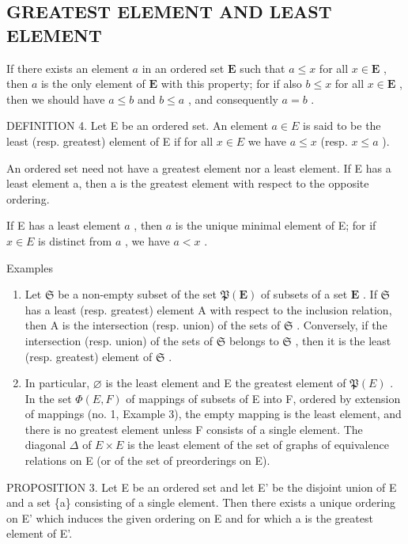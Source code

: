 \subsection{GREATEST ELEMENT AND LEAST ELEMENT}

If there exists an element \(a\) in an ordered set \(\mathbf{E}\) such that \(a \leqslant x\) for all \(x \in \mathbf{E}\) , then \(a\) is the only element of \(\mathbf{E}\) with this property; for if also \(b \leqslant x\) for all \(x \in \mathbf{E}\) , then we should have \(a \leqslant b\) and \(b \leqslant a\) , and consequently \(a = b\) .

DEFINITION 4. Let E be an ordered set. An element \(a \in E\) is said to be the least (resp. greatest) element of E if for all \(x \in E\) we have \(a \leqslant x\) (resp. \(x \leqslant a\) ).

An ordered set need not have a greatest element nor a least element. If E has a least element a, then a is the greatest element with respect to the opposite ordering.

If E has a least element \(a\) , then \(a\) is the unique minimal element of E; for if \(x \in E\) is distinct from \(a\) , we have \(a < x\) .

Examples

\begin{enumerate}
\def\labelenumi{(\arabic{enumi})}
\item
  Let \(\mathfrak{S}\) be a non-empty subset of the set \(\mathfrak{P}(\mathbf{E})\) of subsets of a set \(\mathbf{E}\) . If \(\mathfrak{S}\) has a least (resp. greatest) element A with respect to the inclusion relation, then A is the intersection (resp. union) of the sets of \(\mathfrak{S}\) . Conversely, if the intersection (resp. union) of the sets of \(\mathfrak{S}\) belongs to \(\mathfrak{S}\) , then it is the least (resp. greatest) element of \(\mathfrak{S}\) .
\item
  In particular, \(\varnothing\) is the least element and E the greatest element of \(\mathfrak{P}(E)\) . In the set \(\Phi(E, F)\) of mappings of subsets of E into F, ordered by extension of mappings (no. 1, Example 3), the empty mapping is the least element, and there is no greatest element unless F consists of a single element. The diagonal \(\Delta\) of \(E \times E\) is the least element of the set of graphs of equivalence relations on E (or of the set of preorderings on E).
\end{enumerate}

PROPOSITION 3. Let E be an ordered set and let E' be the disjoint union of E and a set \{a\} consisting of a single element. Then there exists a unique ordering on E' which induces the given ordering on E and for which a is the greatest element of E'.

